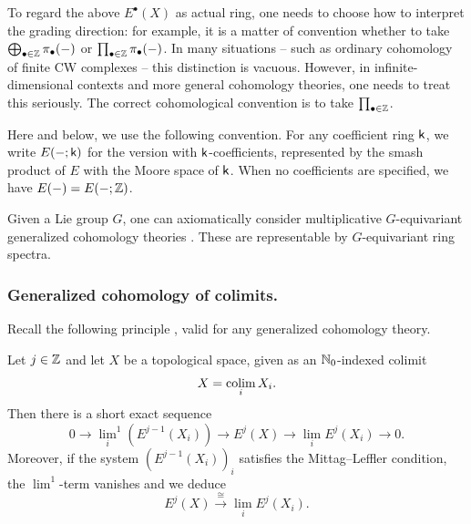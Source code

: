 \begin{remark}\label{remark: sum and product convention for generalized cohomology theories}
To regard the above $E^{\bullet}(X)$ as actual ring, one needs to choose how to interpret the grading direction: for example, it is a matter of convention whether to take $\bigoplus_{\bullet \in \operatorname{\mathbb{Z}}} \pi_{\bullet}(-)$ or $\prod_{\bullet \in \operatorname{\mathbb{Z}}} \pi_{\bullet}(-)$.
%
In many situations -- such as ordinary cohomology of finite CW complexes -- this distinction is vacuous. However, in infinite-dimensional contexts and more general cohomology theories, one needs to treat this seriously. The correct cohomological convention is to take $\prod_{\bullet \in \operatorname{\mathbb{Z}}}$. 
\end{remark}


\begin{notation}
Here and below, we use the following convention. For any coefficient ring $\mathsf{k}$, we write $E(-; \mathsf{k})$ for the version with $\mathsf{k}$-coefficients, represented by the smash product of $E$ with the Moore space of $\mathsf{k}$.  When no coefficients are specified, we have $E(-) = E(-; \operatorname{\mathbb{Z}})$.    
\end{notation}



Given a Lie group $G$, one can axiomatically consider multiplicative $G$-equivariant generalized cohomology theories \cite[\S XIII]{May96}. These are representable by $G$-equivariant ring spectra.





\subsubsection{Generalized cohomology of colimits.}\label{subsubsection: K-theory of colimits}
Recall the following principle \cite[\S 19.4]{May99}, valid for any generalized cohomology theory.
\begin{recollection}
Let $j \in \operatorname{\mathbb{Z}}$ and let $X$ be a topological space, given as an $\operatorname{\mathbb{N}}_0$-indexed colimit
\begin{equation*}
    X = \operatorname*{colim}_{i} X_i.
\end{equation*}
Then there is a short exact sequence
\begin{equation*}
0 \to {\lim_i}^1 (E^{j-1}(X_i)) \to E^j(X) \to \lim_i E^j(X_i) \to 0.    
\end{equation*}
Moreover, if the system $(E^{j-1}(X_i))_{i}$ satisfies the Mittag--Leffler condition, the ${\lim}^1$-term vanishes and we deduce
\begin{equation*}
    E^j(X) \xrightarrow{\cong} \lim_i E^j(X_i).
\end{equation*}
\end{recollection}

